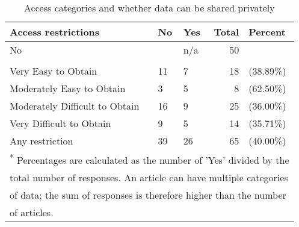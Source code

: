 \begin{table}[!h]
\centering
\caption{\label{tab:access_provision}Access categories and whether data can be shared privately}
\centering
\begin{tabular}[t]{lllrl}
\toprule
Access restrictions & No & Yes & Total & Percent\\
\midrule
No &  & n/a & 50 & \\
\midrule\\
Very Easy to Obtain & 11 & 7 & 18 & (38.89\%)\\
Moderately Easy to Obtain & 3 & 5 & 8 & (62.50\%)\\
Moderately Difficult to Obtain & 16 & 9 & 25 & (36.00\%)\\
Very Difficult to Obtain & 9 & 5 & 14 & (35.71\%)\\
\midrule
\addlinespace
Any restriction & 39 & 26 & 65 & (40.00\%)\\
\bottomrule
\multicolumn{5}{l}{\textsuperscript{*} Percentages are calculated as the number of 'Yes' divided by the}\\
\multicolumn{5}{l}{total number of responses. An article can have multiple categories}\\
\multicolumn{5}{l}{of data; the sum of responses is therefore higher than the number}\\
\multicolumn{5}{l}{of articles.}\\
\end{tabular}
\end{table}
